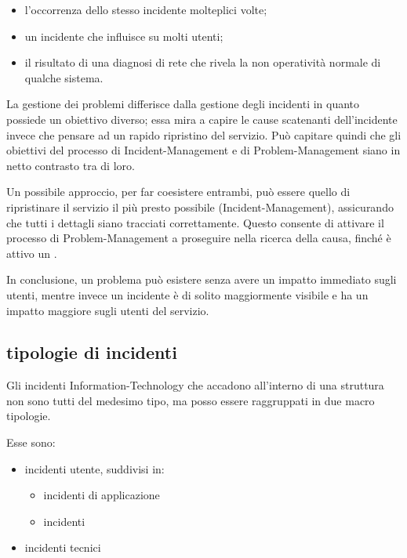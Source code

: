 \begin{itemize}
\item{l'occorrenza dello stesso incidente molteplici volte;}
\item{un incidente che influisce su molti utenti;}
\item{il risultato di una diagnosi di rete che rivela la non operatività normale di qualche sistema.}
\end{itemize}

La gestione dei problemi differisce dalla gestione degli incidenti in quanto possiede un obiettivo diverso; essa mira a capire le cause scatenanti dell'incidente invece che pensare ad un rapido ripristino del servizio. Può capitare quindi che gli obiettivi del processo di \ac{Incident-Management} e di \ac{Problem-Management} siano in netto contrasto tra di loro.

Un possibile approccio, per far coesistere entrambi, può essere quello di ripristinare il servizio il più presto possibile (\ac{Incident-Management}), assicurando che tutti i dettagli siano tracciati correttamente. Questo consente di attivare il processo di \ac{Problem-Management} a proseguire nella ricerca della causa, finché è attivo un .

In conclusione, un problema può esistere senza avere un impatto immediato sugli utenti, mentre invece un incidente è di solito maggiormente visibile e ha un impatto maggiore sugli utenti del servizio.

\subsection[Tipologie di incidenti]{tipologie di incidenti}
\label{prc-incident-typology}
Gli incidenti \acs{Information-Technology} che accadono all'interno di una struttura non sono tutti del medesimo tipo, ma posso essere raggruppati in due macro tipologie.

Esse sono:

\begin{itemize}
\item{incidenti utente, suddivisi in:}
\begin{itemize}
\item{incidenti di applicazione}
\item{incidenti }
\end{itemize}
\item{incidenti tecnici}
\end{itemize}

